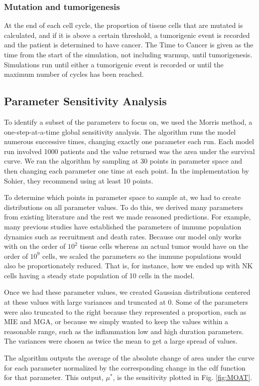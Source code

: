\documentclass[11pt]{article}
\begin{document}
\subsubsection{Mutation and tumorigenesis}
At the end of each cell cycle, the proportion of tissue cells that are mutated is calculated, and if it is above a certain threshold, a tumorigenic event is recorded and the patient is determined to have cancer.
The Time to Cancer is given as the time from the start of the simulation, not including warmup, until tumorigenesis.
Simulations run until either a tumorigenic event is recorded or until the maximum number of cycles has been reached.

\subsection{Parameter Sensitivity Analysis}
To identify a subset of the parameters to focus on, we used the Morris method, a one-step-at-a-time global sensitivity analysis.
The algorithm runs the model numerous successive times, changing exactly one parameter each run\cite{morris1991factorial, sohier2014improvement}.
Each model run involved 1000 patients and the value returned was the area under the survival curve.
We ran the algorithm by sampling at 30 points in parameter space and then changing each parameter one time at each point.
In the implementation by Sohier, they recommend using at least 10 points\cite{sohier2014improvement}.
\par
To determine which points in parameter space to sample at, we had to create distributions on all parameter values.
To do this, we derived many parameters from existing literature and the rest we made reasoned predictions.
For example, many previous studies have established the parameters of immune population dynamics such as recruitment and death rates\cite{de2014modeling}.
Because our model only works with on the order of $10^2$ tissue cells whereas an actual tumor would have on the order of $10^9$ cells\cite{de2014modeling}, we scaled the parameters so the immune populations would also be proportionately reduced.
That is, for instance, how we ended up with NK cells having a steady state population of 10 cells in the model.
\par
Once we had these parameter values, we created Gaussian distributions centered at these values with large variances and truncated at 0.
Some of the parameters were also truncated to the right because they represented a proportion, such as MIE and MGA, or because we simply wanted to keep the values within a reasonable range, such as the inflammation low and high duration parameters.
The variances were chosen as twice the mean to get a large spread of values.
\par
The algorithm outputs the average of the absolute change of area under the curve for each parameter normalized by the corresponding change in the cdf function for that parameter.
This output, $\mu^*$, is the sensitivity plotted in Fig. \ref{fig:MOAT}.
\end{document}
